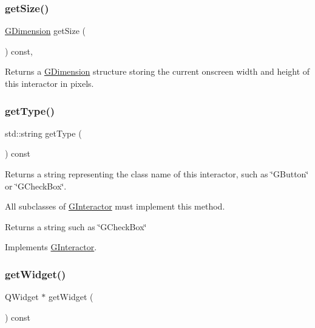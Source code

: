 \subsubsection{\texorpdfstring{get\+Size()}{getSize()}}
{\footnotesize\ttfamily \mbox{\hyperlink{classGDimension}{G\+Dimension}} get\+Size (\begin{DoxyParamCaption}{ }\end{DoxyParamCaption}) const\hspace{0.3cm}{\ttfamily [virtual]}, {\ttfamily [inherited]}}



Returns a \mbox{\hyperlink{classGDimension}{G\+Dimension}} structure storing the current onscreen width and height of this interactor in pixels. 

\mbox{\label{classGCanvas_a9896d58fcfebbf1025aeeb5b8b9ede80}} 
\subsubsection{\texorpdfstring{get\+Type()}{getType()}}
{\footnotesize\ttfamily std\+::string get\+Type (\begin{DoxyParamCaption}{ }\end{DoxyParamCaption}) const\hspace{0.3cm}{\ttfamily [virtual]}}



Returns a string representing the class name of this interactor, such as \char`\"{}\+G\+Button\char`\"{} or \char`\"{}\+G\+Check\+Box\char`\"{}. 

All subclasses of \mbox{\hyperlink{classGInteractor}{G\+Interactor}} must implement this method. \begin{DoxyReturn}{Returns}
a string such as \char`\"{}\+G\+Check\+Box\char`\"{} 
\end{DoxyReturn}


Implements \mbox{\hyperlink{classGInteractor_a799e073a127b428cc841086d42ea4fed}{G\+Interactor}}.

\mbox{\label{classGCanvas_a326ee51b5561f807df7b29a1c101f7fd}} 
\subsubsection{\texorpdfstring{get\+Widget()}{getWidget()}}
{\footnotesize\ttfamily Q\+Widget $\ast$ get\+Widget (\begin{DoxyParamCaption}{ }\end{DoxyParamCaption}) const\hspace{0.3cm}{\ttfamily [virtual]}}



